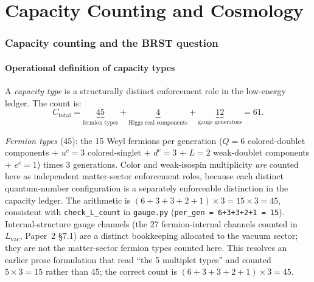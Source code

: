 \documentclass[11pt,a4paper]{article}
\theoremstyle{definition}
\begin{document}

\part{Capacity Counting and Cosmology}
\label{part:cosmo}


\section{Capacity counting and the BRST question}
\label{sec:capacity_count}


\subsection{Operational definition of capacity types}

A \emph{capacity type} is a structurally distinct enforcement role
in the low-energy ledger.  The count is:
\begin{equation}
  C_{\mathrm{total}} = \underbrace{45}_{\text{fermion types}}
    + \underbrace{4}_{\text{Higgs real components}}
    + \underbrace{12}_{\text{gauge generators}} = 61.
\end{equation}

\noindent\textit{Fermion types} (45): the 15 Weyl fermions per
generation ($Q = 6$ colored-doublet components $+$ $u^c = 3$
colored-singlet $+$ $d^c = 3$ $+$ $L = 2$ weak-doublet components
$+$ $e^c = 1$) times 3 generations.  Color and weak-isospin
multiplicity \emph{are} counted here as independent matter-sector
enforcement roles, because each distinct quantum-number configuration
is a separately enforceable distinction in the capacity ledger.  The
arithmetic is $(6+3+3+2+1) \times 3 = 15 \times 3 = 45$, consistent
with \texttt{check\_L\_count} in \texttt{gauge.py} (\texttt{per\_gen =
6+3+3+2+1 = 15}).  Internal-structure gauge channels (the 27
fermion-internal channels counted in $L_{\mathrm{vac}}$, Paper~2
\S7.1) are a distinct bookkeeping allocated to the vacuum sector;
they are not the matter-sector fermion types counted here.  This
resolves an earlier prose formulation that read ``the 5 multiplet
types'' and counted $5 \times 3 = 15$ rather than 45; the correct
count is $(6+3+3+2+1) \times 3 = 45$.
\end{document}
